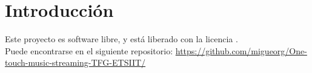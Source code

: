 \chapter{Introducción}

Este proyecto es software libre, y está liberado con la licencia \cite{gplv3}.\\

Puede encontrarse en el siguiente repositorio: \url{https://github.com/migueorg/One-touch-music-streaming-TFG-ETSIIT/}

